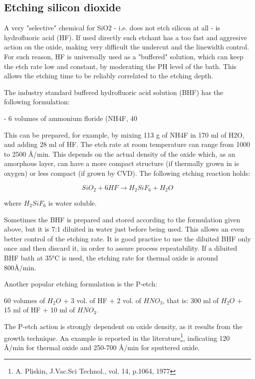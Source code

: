 \subsection{Etching silicon dioxide}
A very "selective" chemical for SiO2 - i.e. does not etch silicon at all - is hydrofluoric acid (HF). If used directly such etchant has a too fast and aggresive action on the oxide, making very difficult the undercut and the linewidth control. For such reason, HF is universally used as a "buffered" solution, which can keep the etch rate low and constant, by moderating the PH level of the bath. This allows the etching time to be reliably correlated to the etching depth.

The industry standard buffered hydrofluoric acid solution (BHF) has the following formulation:

- 6 volumes of ammonium floride (NH4F, 40%

This can be prepared, for example, by mixing 113 g of NH4F in 170 ml of H2O, and adding 28 ml of HF. The etch rate at room temperature can range from 1000 to 2500 Å/min. This depends on the actual density of the oxide which, as an amorphous layer, can have a more compact structure (if thermally grown in is oxygen) or less compact (if grown by CVD). The following etching reaction holds:

\begin{equation}
SiO_2 + 6HF \rightarrow H_2SiF_6 + H_2O
\end{equation}

where $H_2SiF_6$ is water soluble.

Sometimes the BHF is prepared and stored according to the formulation given above, but it is 7:1 diluited in water just before being used.
This allows an even better control of the etching rate.
It is good practice to use the diluited BHF only once and then discard it, in order to assure process repeatability.
If a diluited BHF bath at 35°C is used, the etching rate for thermal oxide is around 800Å/min.

Another popular etching formulation is the P-etch:

60 volumes of $H_2O$ + 3 vol. of HF + 2 vol. of $HNO_3$, that is: 300 ml of $H_2O$ + 15 ml of HF + 10 ml of $HNO_3$.

The P-etch action is strongly dependent on oxide density, as it results from the growth technique.
An example is reported in the literature\footnote{A. Pliskin, J.Vac.Sci Technol., vol. 14, p.1064, 1977}, indicating 120 Å/min for thermal oxide and 250-700 Å/min for sputtered oxide.

